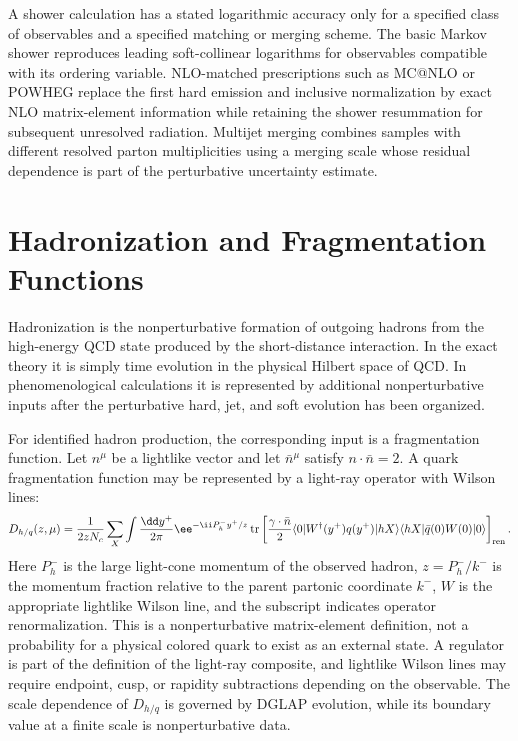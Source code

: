 \begin{controlledapproximation}
A shower calculation has a stated logarithmic accuracy only for a specified
class of observables and a specified matching or merging scheme.  The basic
Markov shower reproduces leading soft-collinear logarithms for observables
compatible with its ordering variable.  NLO-matched prescriptions such as
MC@NLO or POWHEG replace the first hard emission and inclusive normalization
by exact NLO matrix-element information while retaining the shower resummation
for subsequent unresolved radiation.  Multijet merging combines samples with
different resolved parton multiplicities using a merging scale whose residual
dependence is part of the perturbative uncertainty estimate.
\end{controlledapproximation}

\section{Hadronization and Fragmentation Functions}

Hadronization is the nonperturbative formation of outgoing hadrons from the
high-energy QCD state produced by the short-distance interaction.  In the
exact theory it is simply time evolution in the physical Hilbert space of
QCD.  In phenomenological calculations it is represented by additional
nonperturbative inputs after the perturbative hard, jet, and soft evolution
has been organized.

For identified hadron production, the corresponding input is a fragmentation
function.  Let \(n^\mu\) be a lightlike vector and let
\(\bar n^\mu\) satisfy \(n\cdot\bar n=2\).  A quark fragmentation function may
be represented by a light-ray operator with Wilson lines:
\begin{equation}
  D_{h/q}(z,\mu)
  =
  \frac{1}{2zN_c}
  \sum_X
  \int\frac{\dd y^+}{2\pi}
  \ee^{-\ii P_h^- y^+/z}
  \operatorname{tr}
  \left[
    \frac{\gamma\cdot\bar n}{2}
    \langle0|W^\dagger(y^+)q(y^+)|hX\rangle
    \langle hX|\bar q(0)W(0)|0\rangle
  \right]_{\rm ren}.
  \label{eq:quark-fragmentation-function-operator}
\end{equation}
Here \(P_h^-\) is the large light-cone momentum of the observed hadron,
\(z=P_h^-/k^-\) is the momentum fraction relative to the parent partonic
coordinate \(k^-\), \(W\) is the appropriate lightlike Wilson line, and the
subscript indicates operator renormalization.  This is a nonperturbative
matrix-element definition, not a probability for a physical colored quark to
exist as an external state.  A regulator is part of the definition of the
light-ray composite, and lightlike Wilson lines may require endpoint, cusp, or
rapidity subtractions depending on the observable.  The scale dependence of
\(D_{h/q}\) is governed by DGLAP evolution, while its boundary value at a finite
scale is nonperturbative data.

